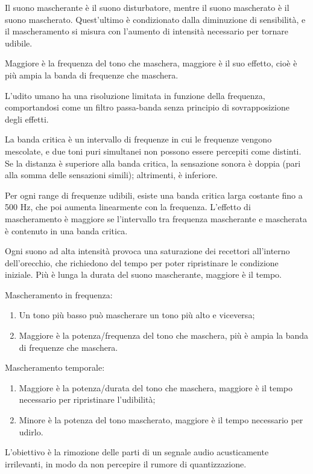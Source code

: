 Il suono mascherante è il suono disturbatore, mentre il suono mascherato è il suono mascherato. Quest'ultimo è condizionato dalla diminuzione di sensibilità, e il mascheramento si misura con l'aumento di intensità necessario per tornare udibile.
 
Maggiore è la frequenza del tono che maschera, maggiore è il suo effetto, cioè è più ampia la banda di frequenze che maschera.
 
L'udito umano ha una risoluzione limitata in funzione della frequenza, comportandosi come un filtro passa-banda senza principio di sovrapposizione degli effetti.
 
La banda critica è un intervallo di frequenze in cui le frequenze vengono mescolate, e due toni puri simultanei non possono essere percepiti come distinti. Se la distanza è superiore alla banda critica, la sensazione sonora è doppia (pari alla somma delle sensazioni simili); altrimenti, è inferiore.

Per ogni range di frequenze udibili, esiste una banda critica larga costante fino a 500 Hz, che poi aumenta linearmente con la frequenza. L'effetto di mascheramento è maggiore se l'intervallo tra frequenza mascherante e mascherata è contenuto in una banda critica.

Ogni suono ad alta intensità provoca una saturazione dei recettori all'interno dell'orecchio, che richiedono del tempo per poter ripristinare le condizione iniziale. Più è lunga la durata del suono mascherante, maggiore è il tempo.

Mascheramento in frequenza:
\begin{enumerate}
	\item Un tono più basso può mascherare un tono più alto e viceversa;
	\item Maggiore è la potenza/frequenza del tono che maschera, più è ampia la banda di frequenze che maschera.
\end{enumerate}

Mascheramento temporale:
\begin{enumerate}
	\item Maggiore è la potenza/durata del tono che maschera, maggiore è il tempo necessario per ripristinare l'udibilità;
	\item Minore è la potenza del tono mascherato, maggiore è il tempo necessario per udirlo.
\end{enumerate}

L'obiettivo è la rimozione delle parti di un segnale audio acusticamente irrilevanti, in modo da non percepire il rumore di quantizzazione.

